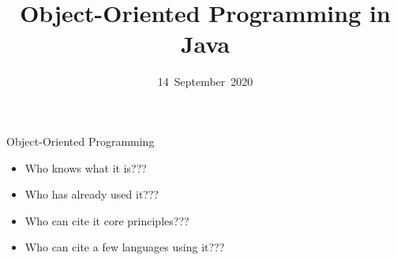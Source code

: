 \documentclass[English,t,%
hyperref={%
    pdftitle={FISA-DE2 OOP in Java},%
    pdfauthor={Guillaume Muller},%
    pdfsubject={OOP in Java},%
    pdfkeywords={OOP,Java}%
    },%
xcolor={pdftex,svgnames} %
]{beamer}
\title[OOP in Java]{Object-Oriented Programming in Java}
\author[\me{}]{\me{}}
\institute[TSÉ + LHC]{
  \inst{Telecom Saint-Étienne, Laboratoire Hubert-Curien}%
}
\date[09/14/2020]{14~September~2020}
\begin{document}
\begin{frame}
  \titlepage
\end{frame}


\begin{frame}{Object-Oriented Programming}

  \begin{itemize}
%
    \item Who knows what it is???
%
    \item Who has already used it???
%
    \item Who can cite it core principles???
%
    \item Who can cite a few languages using it???
%
  \end{itemize}

\end{frame}
\end{document}
